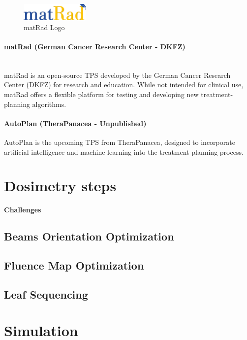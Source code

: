 \begin{figure}
	\vspace{-0.5cm}
	\centering
	\includegraphics[width=0.3\textwidth]{matRad.png}
	\caption{matRad Logo}
	\vspace{-0.5cm}
\end{figure}
\paragraph{matRad (German Cancer Research Center - DKFZ)}\ \\ 
matRad \cite{matrad} is an open-source TPS developed by the German Cancer Research Center (DKFZ) for research and education.
While not intended for clinical use, matRad offers a flexible platform for testing and developing new treatment-planning algorithms.

\paragraph{AutoPlan (TheraPanacea - Unpublished)}
AutoPlan is the upcoming TPS from TheraPanacea, designed to incorporate artificial intelligence and machine learning into the treatment planning process.

\section{Dosimetry steps}
\paragraph{Challenges}
\subsection[BOO]{Beams Orientation Optimization}
\subsection[FMO]{Fluence Map Optimization}
\subsection[LS]{Leaf Sequencing}

\section{Simulation}
